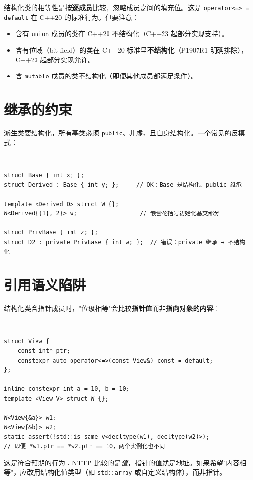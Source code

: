 \documentclass[12pt,a4paper,fontset=fandol]{ctexbook}
\newcommand{\cpplabel}{%
  \tcbox[on line,colback=cppheadbg,colframe=cppheadbg,
    boxrule=0pt,arc=1pt,left=2pt,right=2pt,top=1pt,bottom=1pt,
    colupper=white,fontupper=\scriptsize\bfseries]{C++}}
\newcommand{\cppxxlabel}[1]{%
  \tcbox[on line,colback=cpp20bg,colframe=cpp20bg,
    boxrule=0pt,arc=1pt,left=2pt,right=2pt,top=1pt,bottom=1pt,
    colupper=white,fontupper=\scriptsize\bfseries]{#1}}
\newcommand{\cpp}[1]{C++#1}
\newcommand{\kw}[1]{\texttt{#1}}
\begin{document}
结构化类的相等性是按\textbf{逐成员}比较，忽略成员之间的填充位。这是 \kw{operator<=> = default} 在 \cpp{20} 的标准行为。但要注意：

\begin{itemize}
  \item 含有 \kw{union} 成员的类在 \cpp{20} 不结构化（C++23 起部分实现支持）。
  \item 含有位域（bit-field）的类在 \cpp{20} 标准里\textbf{不结构化}（P1907R1 明确排除），\cpp{23} 起部分实现允许。
  \item 含 \kw{mutable} 成员的类不结构化（即便其他成员都满足条件）。
\end{itemize}

\section{继承的约束}

派生类要结构化，所有基类必须 \kw{public}、非虚、且自身结构化。一个常见的反模式：

\cpplabel\ \begin{lstlisting}
struct Base { int x; };
struct Derived : Base { int y; };     // OK：Base 是结构化、public 继承

template <Derived D> struct W {};
W<Derived{{1}, 2}> w;                  // 嵌套花括号初始化基类部分

struct PrivBase { int z; };
struct D2 : private PrivBase { int w; };  // 错误：private 继承 → 不结构化
\end{lstlisting}

\section{引用语义陷阱}

结构化类含指针成员时，"位级相等"会比较\textbf{指针值}而非\textbf{指向对象的内容}：

\cppxxlabel{C++20}\ \begin{lstlisting}
struct View {
    const int* ptr;
    constexpr auto operator<=>(const View&) const = default;
};

inline constexpr int a = 10, b = 10;
template <View V> struct W {};

W<View{&a}> w1;
W<View{&b}> w2;
static_assert(!std::is_same_v<decltype(w1), decltype(w2)>);
// 即便 *w1.ptr == *w2.ptr == 10，两个实例化也不同
\end{lstlisting}

这是符合预期的行为：NTTP 比较的是\emph{值}，指针的值就是地址。如果希望"内容相等"，应改用结构化值类型（如 \kw{std::array} 或自定义结构体），而非指针。
\end{document}
